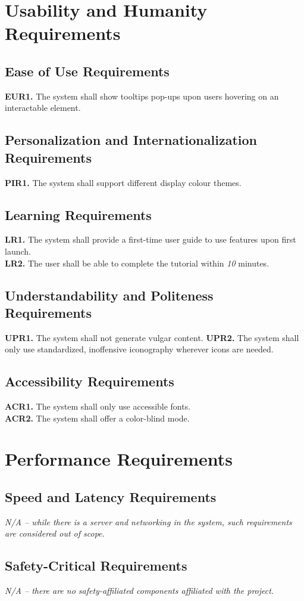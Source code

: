 \documentclass[12pt]{article}
\begin{document}
\section{Usability and Humanity Requirements}
\subsection{Ease of Use Requirements}
\textbf{EUR1.} The system shall show tooltips pop-ups upon users hovering on an interactable element.
\subsection{Personalization and Internationalization Requirements}
\textbf{PIR1.} The system shall support different display colour themes.
\subsection{Learning Requirements}
\textbf{LR1.} The system shall provide a first-time user guide to use features upon first launch. \\
\textbf{LR2.} The user shall be able to complete the tutorial within \emph{10} minutes.
\subsection{Understandability and Politeness Requirements}
\textbf{UPR1.} The system shall not generate vulgar content.
\textbf{UPR2.} The system shall only use standardized, inoffensive iconography wherever icons are needed.
\subsection{Accessibility Requirements}
\textbf{ACR1.} The system shall only use accessible fonts. \\
\textbf{ACR2.} The system shall offer a color-blind mode.
\section{Performance Requirements}
\subsection{Speed and Latency Requirements}
\emph{N/A -- while there is a server and networking in the system, such requirements are considered out of scope.}
\subsection{Safety-Critical Requirements}
\emph{N/A -- there are no safety-affiliated components affiliated with the project.}
\end{document}
